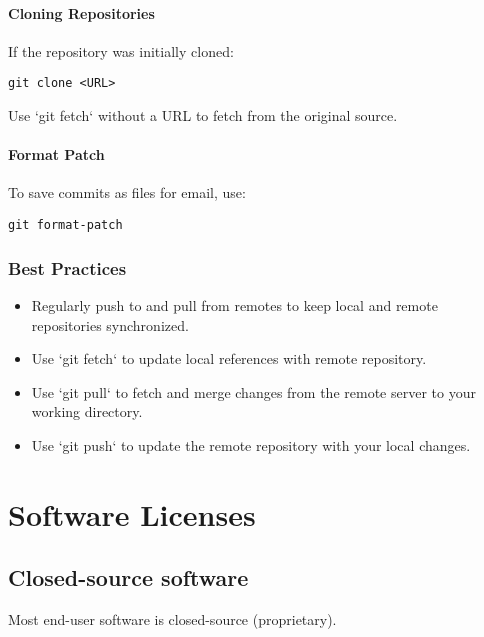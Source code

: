 \documentclass[12pt]{article}
\begin{document}
\paragraph{Cloning Repositories}
If the repository was initially cloned:
\begin{lstlisting}
git clone <URL>
\end{lstlisting}
Use `git fetch` without a URL to fetch from the original source.

\paragraph{Format Patch}
To save commits as files for email, use:
\begin{lstlisting}
git format-patch
\end{lstlisting}

\subsubsection{Best Practices}
\begin{itemize}
    \item Regularly push to and pull from remotes to keep local and remote repositories synchronized.
    \item Use `git fetch` to update local references with remote repository.
    \item Use `git pull` to fetch and merge changes from the remote server to your working directory.
    \item Use `git push` to update the remote repository with your local changes.
\end{itemize}

















\newpage
\section{Software Licenses}

\subsection{Closed-source software}
Most end-user software is closed-source (proprietary).
\end{document}

